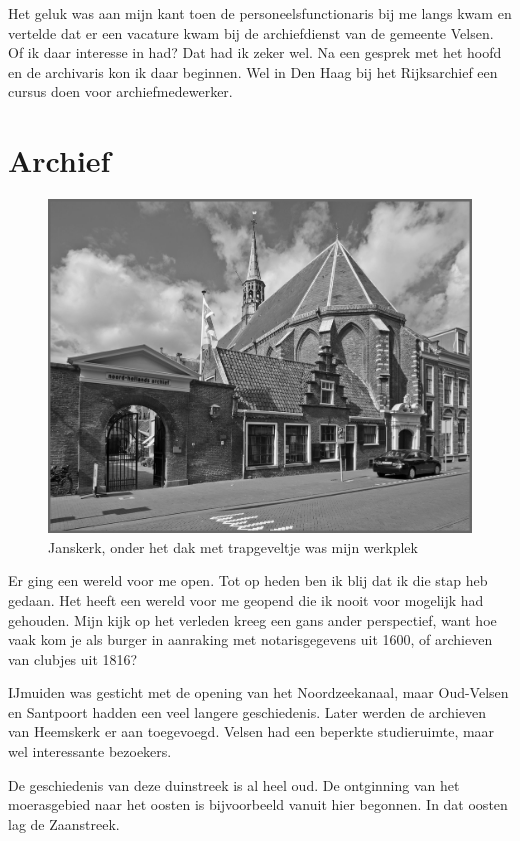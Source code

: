 \documentclass[12pt,twoside, openright]{memoir}
\begin{document}
Het geluk was aan mijn kant toen de personeelsfunctionaris bij me langs kwam en vertelde dat er een vacature kwam bij de archiefdienst van de gemeente Velsen. Of ik daar interesse in had? Dat had ik zeker wel. Na een gesprek met het hoofd en de archivaris kon ik daar beginnen. Wel in Den Haag bij het Rijksarchief een cursus doen voor archiefmedewerker. 

\section*{Archief} %
\label{cha:archief}

\begin{figure}
\centering
\includegraphics[width=\textwidth]{img/285Janskerk.jpg}
\caption*{\footnotesize Janskerk, onder het dak met trapgeveltje was mijn werkplek}
\end{figure}

Er ging een wereld voor me open. Tot op heden ben ik blij dat ik die stap heb gedaan. Het heeft een wereld voor me geopend die ik nooit voor mogelijk had gehouden. Mijn kijk op het verleden kreeg een gans ander perspectief, want hoe vaak kom je als burger in aanraking met notarisgegevens uit 1600, of archieven van clubjes uit 1816?

IJmuiden was gesticht met de opening van het Noordzeekanaal, maar Oud-Velsen en Santpoort hadden een veel langere geschiedenis. Later werden de archieven van Heemskerk er aan toegevoegd. Velsen had een beperkte studieruimte, maar wel interessante bezoekers. 

De geschiedenis van deze duinstreek is al heel oud. De ontginning van het moerasgebied naar het oosten is bijvoorbeeld vanuit hier begonnen. In dat oosten lag de Zaanstreek. 
\end{document}
